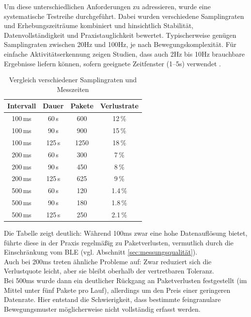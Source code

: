Um diese unterschiedlichen Anforderungen zu adressieren, wurde eine systematische Testreihe durchgeführt. Dabei wurden verschiedene Samplingraten und Erhebungszeiträume kombiniert und hinsichtlich Stabilität, Datenvollständigkeit und Praxistauglichkeit bewertet.
Typischerweise genügen Samplingraten zwischen 20Hz und 100Hz, je nach Bewegungskomplexität. Für einfache Aktivitätserkennung zeigen Studien, dass auch 2Hz bis 10Hz brauchbare Ergebnisse liefern können, sofern geeignete Zeitfenster (1–5s) verwendet \cite{jsss-13-187-2024}.

\begin{table}[H]
	\centering
	\begin{tabular}{c c c c}
		\hline
		\textbf{Intervall} & \textbf{Dauer} & \textbf{Pakete} & \textbf{Verlustrate} \\
		\hline
		100\,ms & 60\,s  & 600  & 12\,\% \\
		100\,ms & 90\,s  & 900  & 15\,\% \\
		100\,ms & 125\,s & 1250 & 18\,\% \\
		\hline
		200\,ms & 60\,s  & 300  & 7\,\% \\
		200\,ms & 90\,s  & 450  & 8\,\% \\
		200\,ms & 125\,s & 625  & 9\,\% \\
		\hline
		500\,ms & 60\,s  & 120  & 1.4\,\% \\
		500\,ms & 90\,s  & 180  & 1.8\,\% \\
		500\,ms & 125\,s & 250  & 2.1\,\% \\
		\hline
	\end{tabular}
	\caption{Vergleich verschiedener Samplingraten und Messzeiten}
	\label{tab:samplingTests}
\end{table}

Die Tabelle zeigt deutlich: Während 100ms zwar eine hohe Datenauflösung bietet, führte diese in der Praxis regelmäßig zu Paketverlusten, vermutlich durch die Einschränkung vom BLE (vgl. Abschnitt \ref{sec:messungsqualität}).\\
Auch bei 200ms treten ähnliche Probleme auf: Zwar reduziert sich die Verlustquote leicht, aber sie bleibt oberhalb der vertretbaren Toleranz.\\
Bei 500ms wurde dann ein deutlicher Rückgang an Paketverlusten festgestellt (im Mittel unter fünf Pakete pro Lauf), allerdings um den Preis einer geringeren Datenrate. Hier entstand die Schwierigkeit, dass bestimmte feingranulare Bewegungsmuster möglicherweise nicht vollständig erfasst werden.\\

